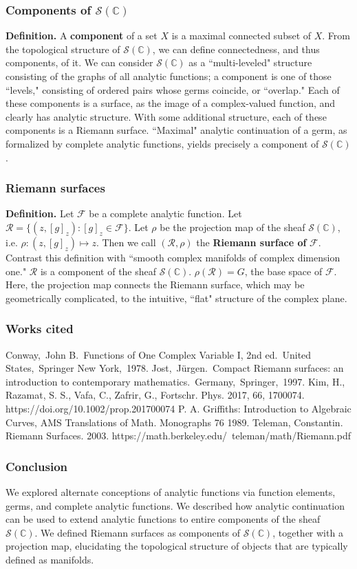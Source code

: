 \documentclass{beamer}
\newcommand{\cs}{\mathbb{C}}
\begin{document}
	\begin{frame}
		\frametitle{Components of $\mathscr S(\cs)$}
		\textbf{Definition.} A \textbf{component} of a set $X$ is a maximal connected subset of $X$. 
		\vskip0.2in
		From the topological structure of $\mathscr S(\cs)$, we can define connectedness, and thus components, of it. We can consider $\mathscr S(\cs)$ as a ``multi-leveled" structure consisting of the graphs of all analytic functions; a component is one of those ``levels," consisting of ordered pairs whose germs coincide, or ``overlap." Each of these components is a surface, as the image of a complex-valued function, and clearly has analytic structure. With some additional structure, each of these components is a Riemann surface.
		\vskip0.2in
		``Maximal" analytic continuation of a germ, as formalized by complete analytic functions, yields precisely a component of $\mathscr S(\cs)$.
	\end{frame}

	\begin{frame}
		\frametitle{Riemann surfaces}
		\textbf{Definition.} Let $\mathscr F$ be a complete analytic function. Let $\mathscr R = \{(z, [g]_z) : [g]_z \in \mathscr F\}$. Let $\rho$ be the projection map of the sheaf $\mathscr S(\cs)$, i.e. $\rho : (z, [g]_z) \mapsto z$. Then we call $(\mathscr R, \rho)$ the \textbf{Riemann surface of} $\boldsymbol{\mathscr F}$.
		\vskip0.2in
		Contrast this definition with ``smooth complex manifolds of complex dimension one."
		\vskip0.2in
		$\mathscr R$ is a component of the sheaf $\mathscr S(\cs)$. $\rho(\mathscr R) = G$, the base space of $\mathscr F$. Here, the projection map connects the Riemann surface, which may be geometrically complicated, to the intuitive, ``flat" structure of the complex plane.
	\end{frame}
	
	\begin{frame}
		\frametitle{Works cited}
		Conway, John B. Functions of One Complex Variable I, 2nd ed. United States, Springer New York, 1978.
		\vskip0.05in
		Jost, Jürgen. Compact Riemann surfaces: an introduction to contemporary mathematics. Germany, Springer, 1997.
		\vskip0.05in
		Kim, H., Razamat, S. S., Vafa, C., Zafrir, G., Fortschr. Phys. 2017, 66, 1700074. https://doi.org/10.1002/prop.201700074
		\vskip0.05in
		P. A. Griffiths: Introduction to Algebraic Curves, AMS Translations of
		Math. Monographs 76 1989.
		\vskip0.05in
		Teleman, Constantin. Riemann Surfaces. 2003. https://math.berkeley.edu/~teleman/math/Riemann.pdf
	\end{frame}

	\begin{frame}
		\frametitle{Conclusion}
		We explored alternate conceptions of analytic functions via function elements, germs, and complete analytic functions.
		\vskip0.2in
		We described how analytic continuation can be used to extend analytic functions to entire components of the sheaf $\mathscr S(\cs)$.
		\vskip0.2in
		We defined Riemann surfaces as components of $\mathscr S(\cs)$, together with a projection map, elucidating the topological structure of objects that are typically defined as manifolds.
	\end{frame}
	
\end{document}
